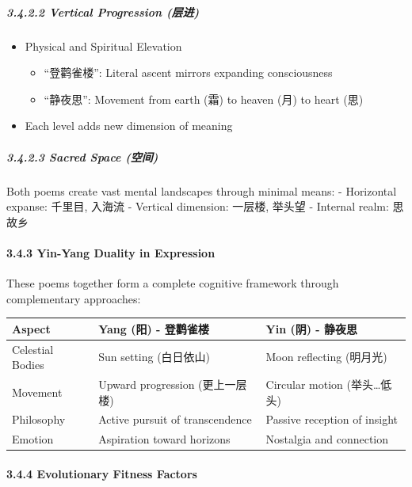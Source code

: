 \hypertarget{vertical-progression-ux5c42ux8fdb}{%
\subparagraph{3.4.2.2 Vertical Progression
(层进)}\label{vertical-progression-ux5c42ux8fdb}}

\begin{itemize}
\tightlist
\item
  Physical and Spiritual Elevation

  \begin{itemize}
  \tightlist
  \item
    ``登鹳雀楼'': Literal ascent mirrors expanding consciousness
  \item
    ``静夜思'': Movement from earth (霜) to heaven (月) to heart (思)
  \end{itemize}
\item
  Each level adds new dimension of meaning
\end{itemize}

\hypertarget{sacred-space-ux7a7aux95f4}{%
\subparagraph{3.4.2.3 Sacred Space
(空间)}\label{sacred-space-ux7a7aux95f4}}

Both poems create vast mental landscapes through minimal means: -
Horizontal expanse: 千里目, 入海流 - Vertical dimension: 一层楼, 举头望
- Internal realm: 思故乡

\hypertarget{yin-yang-duality-in-expression}{%
\paragraph{3.4.3 Yin-Yang Duality in
Expression}\label{yin-yang-duality-in-expression}}

These poems together form a complete cognitive framework through
complementary approaches:

\begin{longtable}[]{@{}lll@{}}
\toprule
Aspect & Yang (阳) - 登鹳雀楼 & Yin (阴) - 静夜思\tabularnewline
\midrule
\endhead
Celestial Bodies & Sun setting (白日依山) & Moon reflecting
(明月光)\tabularnewline
Movement & Upward progression (更上一层楼) & Circular motion
(举头\ldots 低头)\tabularnewline
Philosophy & Active pursuit of transcendence & Passive reception of
insight\tabularnewline
Emotion & Aspiration toward horizons & Nostalgia and
connection\tabularnewline
\bottomrule
\end{longtable}

\hypertarget{evolutionary-fitness-factors}{%
\paragraph{3.4.4 Evolutionary Fitness
Factors}\label{evolutionary-fitness-factors}}

